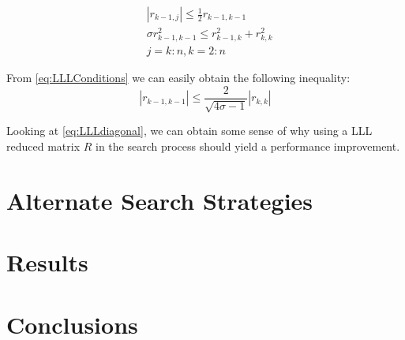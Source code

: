 \documentclass[12pt,Bold,letterpaper]{mcgilletdclass}
\begin{document}
\begin{align} \label{eq:LLLConditions}
&\left | r_{k-1,j} \right | \le \frac{1}{2}r_{k-1,k-1} \\
&\sigma r_{k-1,k-1}^2 \le r_{k-1,k}^2 + r_{k,k}^2 \\
&j = k:n, k=2:n
\end{align}

From \eqref{eq:LLLConditions} we can easily obtain the following inequality:
\begin{equation} \label{eq:LLLdiagonal}
\left | r_{k-1,k-1} \right | \le \frac{2}{\sqrt{4\sigma -1}}\left | r_{k,k} \right |
\end{equation}

Looking at \eqref{eq:LLLdiagonal}, we can obtain some sense of why using a LLL reduced matrix $R$ in the search process should yield a performance improvement.

\chapter{Alternate Search Strategies} \label{chap:Searches}

\chapter{Results} \label{chap:Results}

\chapter{Conclusions} \label{chap:Conclusion}






\end{document}
